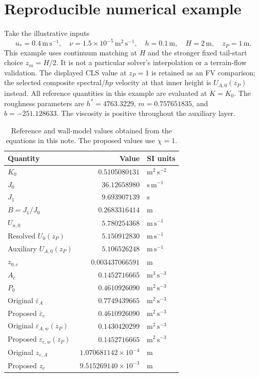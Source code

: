 \documentclass[11pt,a4paper]{article}
\numberwithin{equation}{section}
\newcommand{\eps}{\varepsilon}
\newcommand{\ust}{u_*}
\newcommand{\avg}[1]{\overline{#1}}
\newcommand{\units}[1]{\,\mathrm{#1}}
\newcommand{\Aref}{A_c}
\newcommand{\ycut}{z_c}
\newcommand{\EAw}{\eps_{A,w}}
\newcommand{\ECw}{\eps_{c,w}}
\begin{document}
\section{Reproducible numerical example}
\label{sec:numerical}
Take the illustrative inputs
\begin{equation}
 \ust=0.4\units{m\,s^{-1}},\quad
 \nu=1.5\times10^{-5}\units{m^2\,s^{-1}},\quad
 h=0.1\units m,\quad H=2\units m,\quad z_P=1\units m.
\label{eq:exampleinputs}
\end{equation}
This example uses continuum matching at $H$ and the stronger fixed
tail-start choice $z_m=H/2$. It is not a particular solver's interpolation
or a terrain-flow validation. The displayed CLS value at $z_P=1$ is
retained as an FV comparison; the selected composite spectral/$hp$
velocity at that inner height is $U_{A,0}(z_P)$ instead.
All reference quantities in this example are evaluated at $K=K_0$.
The roughness parameters are
$h^*=4763.3229$, $m=0.757651835$, and $b=-251.128633$.
The viscosity is positive throughout the auxiliary layer.

\begin{table}[htbp]
\centering\small
\begin{tabular}{@{}lrl@{}}
\toprule
Quantity & Value & SI units\\
\midrule
$K_0$ & $0.5105080131$ & $\mathrm{m^2\,s^{-2}}$\\
$J_0$ & $36.12658980$ & $\mathrm{s\,m^{-1}}$\\
$J_1$ & $9.693907139$ & $\mathrm{s}$\\
$B=J_1/J_0$ & $0.2683316414$ & $\mathrm{m}$\\
$U_{n,0}$ & $5.780254368$ & $\mathrm{m\,s^{-1}}$\\
Resolved $U_0(z_P)$ & $5.150912830$ & $\mathrm{m\,s^{-1}}$\\
Auxiliary $U_{A,0}(z_P)$ & $5.106526248$ & $\mathrm{m\,s^{-1}}$\\
$z_{0,c}$ & $0.003437066591$ & $\mathrm{m}$\\
$\Aref$ & $0.1452716665$ & $\mathrm{m^3\,s^{-3}}$\\
$P_0$ & $0.4610926090$ & $\mathrm{m^2\,s^{-3}}$\\
Original $\avg\eps_A$ & $0.7749439665$ & $\mathrm{m^2\,s^{-3}}$\\
Proposed $\avg\eps_c$ & $0.4610926090$ & $\mathrm{m^2\,s^{-3}}$\\
Original $\EAw(z_P)$ & $0.1430420299$ & $\mathrm{m^2\,s^{-3}}$\\
Proposed $\ECw(z_P)$ & $0.1452716665$ & $\mathrm{m^2\,s^{-3}}$\\
Original $z_{\eps,A}$ & $1.070681142\times10^{-4}$ & $\mathrm{m}$\\
Proposed $\ycut$ & $9.515269140\times10^{-3}$ & $\mathrm{m}$\\
\bottomrule
\end{tabular}
\caption{Reference and wall-model values obtained from the equations
in this note. The proposed values use $\chi=1$.}
\label{tab:example}
\end{table}
\end{document}
